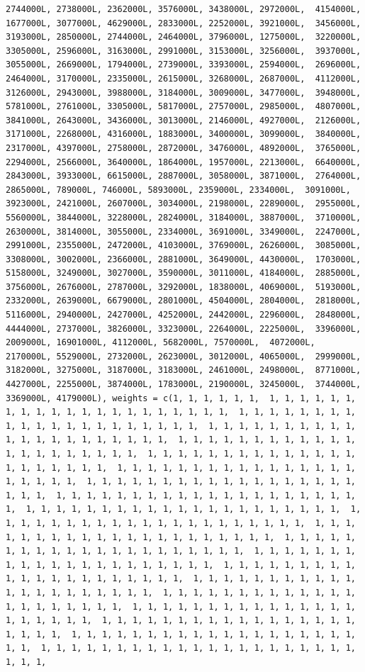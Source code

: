 \documentclass[
]{article}
\begin{document}
\begin{verbatim}
2744000L, 2738000L, 2362000L, 3576000L, 3438000L, 2972000L,  4154000L, 1677000L, 3077000L, 4629000L, 2833000L, 2252000L, 3921000L,  3456000L, 3193000L, 2850000L, 2744000L, 2464000L, 3796000L, 1275000L,  3220000L, 3305000L, 2596000L, 3163000L, 2991000L, 3153000L, 3256000L,  3937000L, 3055000L, 2669000L, 1794000L, 2739000L, 3393000L, 2594000L,  2696000L, 2464000L, 3170000L, 2335000L, 2615000L, 3268000L, 2687000L,  4112000L, 3126000L, 2943000L, 3988000L, 3184000L, 3009000L, 3477000L,  3948000L, 5781000L, 2761000L, 3305000L, 5817000L, 2757000L, 2985000L,  4807000L, 3841000L, 2643000L, 3436000L, 3013000L, 2146000L, 4927000L,  2126000L, 3171000L, 2268000L, 4316000L, 1883000L, 3400000L, 3099000L,  3840000L, 2317000L, 4397000L, 2758000L, 2872000L, 3476000L, 4892000L,  3765000L, 2294000L, 2566000L, 3640000L, 1864000L, 1957000L, 2213000L,  6640000L, 2843000L, 3933000L, 6615000L, 2887000L, 3058000L, 3871000L,  2764000L, 2865000L, 789000L, 746000L, 5893000L, 2359000L, 2334000L,  3091000L, 3923000L, 2421000L, 2607000L, 3034000L, 2198000L, 2289000L,  2955000L, 5560000L, 3844000L, 3228000L, 2824000L, 3184000L, 3887000L,  3710000L, 2630000L, 3814000L, 3055000L, 2334000L, 3691000L, 3349000L,  2247000L, 2991000L, 2355000L, 2472000L, 4103000L, 3769000L, 2626000L,  3085000L, 3308000L, 3002000L, 2366000L, 2881000L, 3649000L, 4430000L,  1703000L, 5158000L, 3249000L, 3027000L, 3590000L, 3011000L, 4184000L,  2885000L, 3756000L, 2676000L, 2787000L, 3292000L, 1838000L, 4069000L,  5193000L, 2332000L, 2639000L, 6679000L, 2801000L, 4504000L, 2804000L,  2818000L, 5116000L, 2940000L, 2427000L, 4252000L, 2442000L, 2296000L,  2848000L, 4444000L, 2737000L, 3826000L, 3323000L, 2264000L, 2225000L,  3396000L, 2009000L, 16901000L, 4112000L, 5682000L, 7570000L,  4072000L, 2170000L, 5529000L, 2732000L, 2623000L, 3012000L, 4065000L,  2999000L, 3182000L, 3275000L, 3187000L, 3183000L, 2461000L, 2498000L,  8771000L, 4427000L, 2255000L, 3874000L, 1783000L, 2190000L, 3245000L,  3744000L, 3369000L, 4179000L), weights = c(1, 1, 1, 1, 1, 1,  1, 1, 1, 1, 1, 1, 1, 1, 1, 1, 1, 1, 1, 1, 1, 1, 1, 1, 1, 1, 1,  1, 1, 1, 1, 1, 1, 1, 1, 1, 1, 1, 1, 1, 1, 1, 1, 1, 1, 1, 1, 1,  1, 1, 1, 1, 1, 1, 1, 1, 1, 1, 1, 1, 1, 1, 1, 1, 1, 1, 1, 1, 1,  1, 1, 1, 1, 1, 1, 1, 1, 1, 1, 1, 1, 1, 1, 1, 1, 1, 1, 1, 1, 1,  1, 1, 1, 1, 1, 1, 1, 1, 1, 1, 1, 1, 1, 1, 1, 1, 1, 1, 1, 1, 1,  1, 1, 1, 1, 1, 1, 1, 1, 1, 1, 1, 1, 1, 1, 1, 1, 1, 1, 1, 1, 1,  1, 1, 1, 1, 1, 1, 1, 1, 1, 1, 1, 1, 1, 1, 1, 1, 1, 1, 1, 1, 1,  1, 1, 1, 1, 1, 1, 1, 1, 1, 1, 1, 1, 1, 1, 1, 1, 1, 1, 1, 1, 1,  1, 1, 1, 1, 1, 1, 1, 1, 1, 1, 1, 1, 1, 1, 1, 1, 1, 1, 1, 1, 1,  1, 1, 1, 1, 1, 1, 1, 1, 1, 1, 1, 1, 1, 1, 1, 1, 1, 1, 1, 1, 1,  1, 1, 1, 1, 1, 1, 1, 1, 1, 1, 1, 1, 1, 1, 1, 1, 1, 1, 1, 1, 1,  1, 1, 1, 1, 1, 1, 1, 1, 1, 1, 1, 1, 1, 1, 1, 1, 1, 1, 1, 1, 1,  1, 1, 1, 1, 1, 1, 1, 1, 1, 1, 1, 1, 1, 1, 1, 1, 1, 1, 1, 1, 1,  1, 1, 1, 1, 1, 1, 1, 1, 1, 1, 1, 1, 1, 1, 1, 1, 1, 1, 1, 1, 1,  1, 1, 1, 1, 1, 1, 1, 1, 1, 1, 1, 1, 1, 1, 1, 1, 1, 1, 1, 1, 1,  1, 1, 1, 1, 1, 1, 1, 1, 1, 1, 1, 1, 1, 1, 1, 1, 1, 1, 1, 1, 1,  1, 1, 1, 1, 1, 1, 1, 1, 1, 1, 1, 1, 1, 1, 1, 1, 1, 1, 1, 1, 1,  1, 1, 1, 1, 1, 1, 1, 1, 1, 1, 1, 1, 1, 1, 1, 1, 1, 1, 1, 1, 1,  1, 1, 1, 1, 1, 1, 1, 1, 1, 1, 1, 1, 1, 1, 1, 1, 1, 1, 1, 1, 1,  1, 1, 1, 1, 1, 1, 1, 1, 1, 1, 1, 1, 1, 1, 1, 1, 1, 1, 1, 1, 1,  1, 1, 1, 
\end{verbatim}
\end{document}
